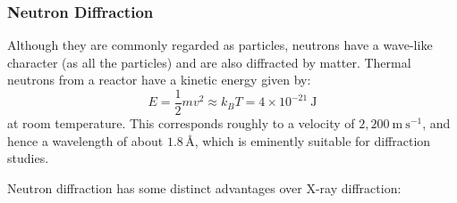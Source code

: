 \documentclass{article}
\theoremstyle{plain}\theoremheaderfont{\normalfont\itshape}\theorembodyfont{\rmfamily}\theoremseparator{.}\newtheorem*{rem}{Remark}\newtheorem*{ex}{Example}\newtheorem*{proof}{Proof}\newtheorem*{altp}{Alternative proof}
\theoremstyle{plain}\theoremheaderfont{\normalfont\bfseries}\theorembodyfont{\rmfamily}\theoremseparator{.}\newtheorem{thm}{Theorem}[section]\newtheorem{lem}[thm]{Lemma}\newtheorem{prop}[thm]{Proposition}\newtheorem*{cor}{Corollary}\newtheorem{defn}[thm]{Definition}\newtheorem{clm}[thm]{Claim}\newtheorem{clminproof}{Claim}\newtheorem*{law}{Law}\newtheorem{pos}[thm]{Postulate}
\theoremstyle{break}\theoremheaderfont{\normalfont\itshape}\theorembodyfont{\rmfamily}\theoremseparator{.\medskip}\newtheorem*{proofskip}{Proof}\newtheorem*{exs}{Examples}\newtheorem*{rems}{Remarks}
\theoremstyle{break}\theoremheaderfont{\normalfont\bfseries}\theorembodyfont{\rmfamily}\theoremseparator{.\medskip}\newtheorem{lemskip}[thm]{Lemma}\newtheorem{defnskip}[thm]{Definition}\newtheorem{propskip}[thm]{Proposition}\newtheorem{thmskip}[thm]{Theorem}
\numberwithin{equation}{section}
\newcommand{\unit}[1]{\ \mathrm{#1}}
\begin{document}
    \subsubsection{Neutron Diffraction}
    Although they are commonly regarded as particles, neutrons have a wave-like character (as all the particles) and are also diffracted by matter. Thermal neutrons from a reactor have a kinetic energy given by:
    \begin{equation}
        E=\frac{1}{2}mv^2\approx k_B T=4\times 10^{-21}\unit{J}
    \end{equation}
    at room temperature. This corresponds roughly to a velocity of \(2,200\unit{m}\unit{s}^{-1}\), and hence a wavelength of about \(1.8\,\text{\AA}\), which is eminently suitable for diffraction studies.

    Neutron diffraction has some distinct advantages over X-ray diffraction:
\end{document}
